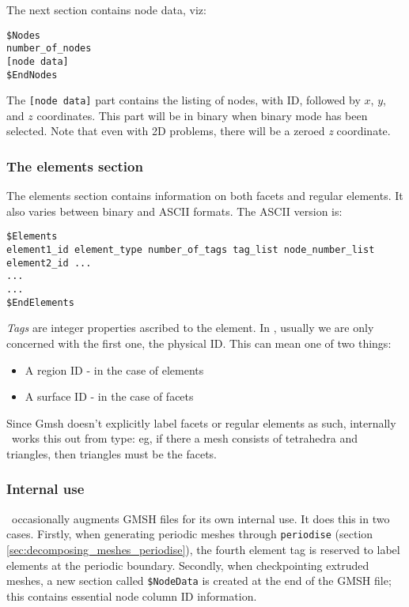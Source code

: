 The next section contains node data, viz:
\begin{lstlisting}
$Nodes
number_of_nodes
[node data]
$EndNodes
\end{lstlisting}

The \lstinline+[node data]+ part contains the listing of nodes, with ID,
followed by $x$, $y$, and $z$ coordinates. This part
will be in binary when binary mode has been selected. Note that even with 2D
problems, there will be a zeroed \textit{z} coordinate.



\subsubsection*{The elements section}\label{sec:gmsh_elements_section}

The elements section contains information on both facets and regular
elements. It also varies between binary and ASCII formats. The ASCII version
is:

\begin{lstlisting}
$Elements
element1_id element_type number_of_tags tag_list node_number_list
element2_id ...
...
...
$EndElements
\end{lstlisting}
\textit{Tags} are integer properties ascribed to the element. In \fluidity,
usually we are only concerned with the first one, the physical ID. This can mean
one of two things:

\begin{itemize}
\item A region ID - in the case of elements
\item A surface ID - in the case of facets
\end{itemize}

Since Gmsh doesn't explicitly label facets or regular elements as such,
internally \fluidity\ works this out from type: eg, if there a mesh consists
of tetrahedra and triangles, then triangles must be the facets.

\subsubsection*{Internal use }
\label{sec:gmsh_internal_use_section}

\fluidity\ occasionally augments GMSH files for its own internal use. It
does this in two cases. Firstly, when generating periodic meshes
through \lstinline+periodise+ (section \ref{sec:decomposing_meshes_periodise}), the
fourth element tag is reserved to label elements at the periodic boundary.
Secondly, when checkpointing extruded meshes, a new section called
\lstinline+$NodeData+ is created at the end of the GMSH file; this contains
essential node column ID information.

